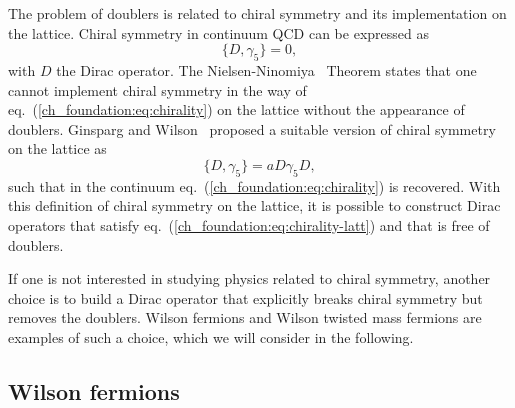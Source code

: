 The problem of doublers is related to chiral symmetry and its implementation on the lattice. Chiral symmetry in continuum QCD can be expressed as 
\begin{equation}
\label{ch_foundation:eq:chirality}
\{D,\gamma_5\}=0,
\end{equation}
with $D$ the Dirac operator. The Nielsen-Ninomiya~\citep{Nielsen:1980rz,Nielsen:1981hk} Theorem states that one cannot implement chiral symmetry in the way of eq.~(\ref{ch_foundation:eq:chirality}) on the lattice without the appearance of doublers. Ginsparg and Wilson~\citep{Ginsparg:1981bj} proposed a suitable version of chiral symmetry on the lattice as
\begin{equation}
\label{ch_foundation:eq:chirality-latt}
\{D,\gamma_5\}=aD\gamma_5D,
\end{equation}
such that in the continuum eq.~(\ref{ch_foundation:eq:chirality}) is recovered. With this definition of chiral symmetry on the lattice, it is possible to construct Dirac operators that satisfy eq.~(\ref{ch_foundation:eq:chirality-latt}) and that is free of doublers. 

If one is not interested in studying physics related to chiral symmetry, another choice is to build a Dirac operator that explicitly breaks chiral symmetry but removes the doublers. Wilson fermions and Wilson twisted mass fermions are examples of such a choice, which we will consider in the following.


\subsection{Wilson fermions}
\label{ch_foundation:subsec:Wilson}

